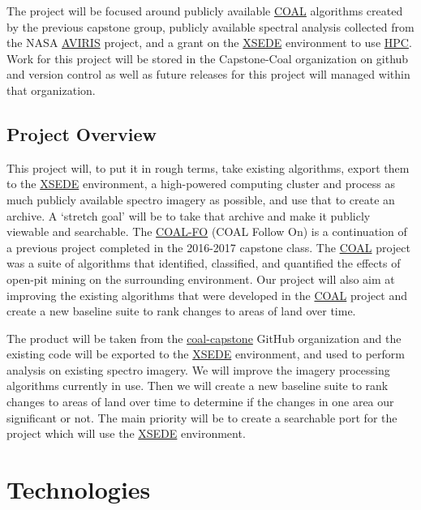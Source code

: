 \documentclass[10pt,draftclsnofoot,onecolumn,journal,compsoc]{IEEEtran}
\begin{document}
\noindent The project will be focused around publicly available \href{https://capstone-coal.github.io/}{COAL} algorithms created by the previous capstone group, publicly available spectral analysis collected from the NASA \href{https://aviris.jpl.nasa.gov/}{AVIRIS} project, and a grant on the \href{https://www.xsede.org/}{XSEDE} environment to use \href{https://en.wikipedia.org/wiki/Supercomputer}{HPC}. Work for this project will be stored in the Capstone-Coal organization on github and version control as well as future releases for this project will managed within that organization.

\subsection{Project Overview}

\noindent This project will, to put it in rough terms, take existing algorithms, export them to the \href{https://www.xsede.org/}{XSEDE} environment, a high-powered computing cluster and process as much publicly available spectro imagery as possible, and use that to create an archive. A ‘stretch goal’ will be to take that archive and make it publicly viewable and searchable. The \href{http://eecs.oregonstate.edu/capstone/cs/capstone.cgi?project=320}{COAL-FO} (COAL Follow On) is a continuation of a previous project completed in the 2016-2017 capstone class. The \href{https://capstone-coal.github.io/}{COAL} project was a suite of algorithms that identified, classified, and quantified the effects of open-pit mining on the surrounding environment. Our project will also aim at improving the existing algorithms that were developed in the \href{https://capstone-coal.github.io/}{COAL} project and create a new baseline suite to rank changes to areas of land over time. \newline

\noindent The product will be taken from the \href{https://capstone-coal.github.io/}{coal-capstone} GitHub organization and the existing code will be exported to the \href{https://www.xsede.org/}{XSEDE} environment, and used to perform analysis on existing spectro imagery. We will improve the imagery processing algorithms currently in use. Then we will create a new baseline suite to rank changes to areas of land over time to determine if the changes in one area our significant or not. The main priority will be to create a searchable port for the project which will use the \href{https://www.xsede.org/}{XSEDE} environment.

\section{Technologies}
\end{document}
